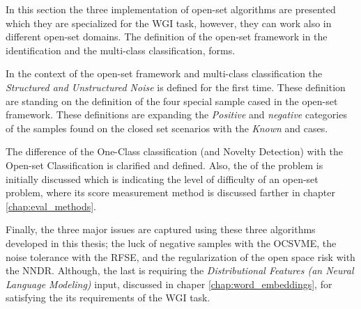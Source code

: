 In this section the three implementation of open-set algorithms are presented which they are specialized for the WGI task, however, they can work also in different open-set domains. The definition of the open-set framework in the identification and the multi-class classification, forms.

In the context of the open-set framework and multi-class classification the \textit{Structured and Unstructured Noise} is defined for the first time. These definition are standing on the definition of the four special sample cased in the open-set framework. These definitions are expanding the \textit{Positive} and \textit{negative} categories of the samples found on the closed set scenarios with the \textit{Known} and  cases. 

The difference of the One-Class classification (and Novelty Detection) with the Open-set Classification is clarified and defined. Also, the  of the problem is initially discussed which is indicating the level of difficulty of an open-set problem, where its score measurement method is discussed farther in chapter \ref{chap:eval_methods}.

Finally, the three major issues are captured using these three algorithms developed in this thesis; the luck of negative samples with the OCSVME, the noise tolerance with the RFSE, and the regularization of the open space risk with the NNDR. Although, the last is requiring the \textit{Distributional Features (an Neural Language Modeling)} input, discussed in chaper \ref{chap:word_embeddings}, for satisfying the its requirements of the WGI task.